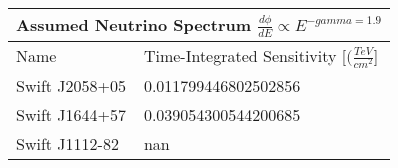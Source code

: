 \documentclass[]{article}
\begin{document}
\begin{tabular}{ |p{3.5cm}||p{4.5cm}|} 
\hline 
\multicolumn{2}{|c|}{Assumed Neutrino Spectrum $ \frac {d \phi}{dE} \propto E ^ {-gamma=1.9} $} \\ 
\hline 
Name&Time-Integrated Sensitivity [$ (\frac{TeV}{cm^{2}} $] \\ 
\hline 
Swift J2058+05 & \num[round-precision=2, round-mode=figures, scientific-notation=true]{0.011799446802502856}  \\ 
Swift J1644+57 & \num[round-precision=2, round-mode=figures, scientific-notation=true]{0.039054300544200685}  \\ 
Swift J1112-82 & \num[round-precision=2, round-mode=figures, scientific-notation=true]{nan}  \\ 
\hline 
\end{tabular} 
\end{document}
